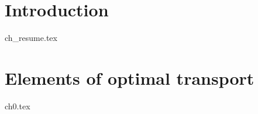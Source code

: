 \documentclass{Classe/Dissertate}
\begin{document}
 \setcounter{page}{1}
 

%


    \lab
    
    
        

~\newpage
\vspace{0.1cm}


~\newpage


~\newpage



    \tableofcontents
     
    \clearpage
    
    \OddChapter%
    
	\setcounter{page}{1}
    \restoregeometry
    
\renewcommand{\contentsname}{}
\setcounter{tocdepth}{3}
\addtocounter{chapter}{0}


\ChangeColor%
\chapter{Introduction}
\LocalTOC%
{ch_resume.tex}
\OddChapter%
\clearpage


\ChangeColor%
\chapter{Elements of optimal transport}
\LocalTOC%
{ch0.tex}
\OddChapter%
\clearpage


%
%
%
\end{document}
